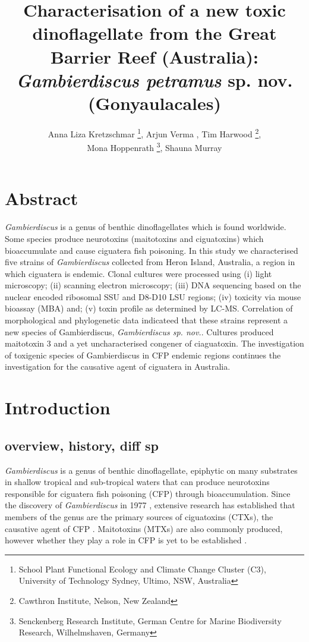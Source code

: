 \documentclass[12pt]{article}
\title{\textbf{Characterisation of a new toxic dinoflagellate from the Great Barrier Reef (Australia): \emph{Gambierdiscus petramus} sp. nov. (Gonyaulacales)}}
\author{Anna Liza Kretzschmar \thanks{School Plant Functional Ecology and Climate Change Cluster (C3), University of Technology Sydney, Ultimo, NSW, Australia}, Arjun Verma \footnotemark[1], Tim Harwood \thanks{Cawthron Institute, Nelson, New Zealand},\\
Mona Hoppenrath \thanks{Senckenberg Research Institute, German Centre for Marine Biodiversity Research, Wilhelmshaven, Germany}, Shauna Murray \footnotemark[1]}
\date{}
\begin{document}
\maketitle
\newpage
\section{Abstract}
\textit{Gambierdiscus} is a genus of benthic dinoflagellates which is found worldwide. Some species produce neurotoxins (maitotoxins and ciguatoxins) which  bioaccumulate and cause ciguatera fish poisoning. In this study we characterised five strains of \textit{Gambierdiscus} collected from Heron Island,  Australia, a region in which ciguatera is endemic. Clonal cultures were processed using (i) light microscopy; (ii) scanning electron microscopy; (iii) DNA sequencing based on the nuclear encoded ribosomal  SSU and D8-D10 LSU regions; (iv) toxicity via mouse bioassay (MBA) and; (v) toxin profile as determined by LC-MS. Correlation of morphological and phylogenetic data indicateed that these strains represent a new species of Gambierdiscus, \emph{Gambierdiscus sp. nov.}. Cultures produced maitotoxin 3 and a yet uncharacterised congener of ciaguatoxin. The investigation of toxigenic species of Gambierdiscus in CFP endemic regions continues the investigation for the causative agent of ciguatera in Australia.
\newpage

\section{Introduction}


\subsection{overview, history, diff sp}
\emph{Gambierdiscus} is a genus of benthic dinoflagellate, epiphytic on many substrates in shallow tropical and sub-tropical waters that can produce neurotoxins responsible for ciguatera fish poisoning (CFP) through bioaccumulation. 
Since the discovery of \emph{Gambierdiscus} in 1977 \cite{yasumoto1977finding}, extensive research has established that members of the genus are the primary sources of ciguatoxins (CTXs), the causative agent of CFP \cite{chinain1997intraspecific,holmes1998gambierdiscus}. Maitotoxins (MTXs) are also commonly produced, however whether they play a role in CFP is yet to be established \cite{kohli2014feeding}. 
\end{document}
